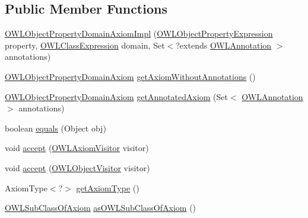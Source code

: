 \subsection*{Public Member Functions}
\begin{DoxyCompactItemize}
\item 
\hyperlink{classuk_1_1ac_1_1manchester_1_1cs_1_1owl_1_1owlapi_1_1_o_w_l_object_property_domain_axiom_impl_a8dd883bf8ac58d387d9b35abd653cf3d}{O\-W\-L\-Object\-Property\-Domain\-Axiom\-Impl} (\hyperlink{interfaceorg_1_1semanticweb_1_1owlapi_1_1model_1_1_o_w_l_object_property_expression}{O\-W\-L\-Object\-Property\-Expression} property, \hyperlink{interfaceorg_1_1semanticweb_1_1owlapi_1_1model_1_1_o_w_l_class_expression}{O\-W\-L\-Class\-Expression} domain, Set$<$?extends \hyperlink{interfaceorg_1_1semanticweb_1_1owlapi_1_1model_1_1_o_w_l_annotation}{O\-W\-L\-Annotation} $>$ annotations)
\item 
\hyperlink{interfaceorg_1_1semanticweb_1_1owlapi_1_1model_1_1_o_w_l_object_property_domain_axiom}{O\-W\-L\-Object\-Property\-Domain\-Axiom} \hyperlink{classuk_1_1ac_1_1manchester_1_1cs_1_1owl_1_1owlapi_1_1_o_w_l_object_property_domain_axiom_impl_a21d04b24f3100c7eaf90d4b30c1011f1}{get\-Axiom\-Without\-Annotations} ()
\item 
\hyperlink{interfaceorg_1_1semanticweb_1_1owlapi_1_1model_1_1_o_w_l_object_property_domain_axiom}{O\-W\-L\-Object\-Property\-Domain\-Axiom} \hyperlink{classuk_1_1ac_1_1manchester_1_1cs_1_1owl_1_1owlapi_1_1_o_w_l_object_property_domain_axiom_impl_a4aab14a032d919fa44319ec108f7fbd4}{get\-Annotated\-Axiom} (Set$<$ \hyperlink{interfaceorg_1_1semanticweb_1_1owlapi_1_1model_1_1_o_w_l_annotation}{O\-W\-L\-Annotation} $>$ annotations)
\item 
boolean \hyperlink{classuk_1_1ac_1_1manchester_1_1cs_1_1owl_1_1owlapi_1_1_o_w_l_object_property_domain_axiom_impl_a81376883daac9a211a1cd51ddcd9b6de}{equals} (Object obj)
\item 
void \hyperlink{classuk_1_1ac_1_1manchester_1_1cs_1_1owl_1_1owlapi_1_1_o_w_l_object_property_domain_axiom_impl_ac91ddde1062e93fceca02f403d5588c3}{accept} (\hyperlink{interfaceorg_1_1semanticweb_1_1owlapi_1_1model_1_1_o_w_l_axiom_visitor}{O\-W\-L\-Axiom\-Visitor} visitor)
\item 
void \hyperlink{classuk_1_1ac_1_1manchester_1_1cs_1_1owl_1_1owlapi_1_1_o_w_l_object_property_domain_axiom_impl_a04bd6b631d39008fb7d6f6d30eec592c}{accept} (\hyperlink{interfaceorg_1_1semanticweb_1_1owlapi_1_1model_1_1_o_w_l_object_visitor}{O\-W\-L\-Object\-Visitor} visitor)
\item 
Axiom\-Type$<$?$>$ \hyperlink{classuk_1_1ac_1_1manchester_1_1cs_1_1owl_1_1owlapi_1_1_o_w_l_object_property_domain_axiom_impl_a7e9d04d59241778481322d288355af20}{get\-Axiom\-Type} ()
\item 
\hyperlink{interfaceorg_1_1semanticweb_1_1owlapi_1_1model_1_1_o_w_l_sub_class_of_axiom}{O\-W\-L\-Sub\-Class\-Of\-Axiom} \hyperlink{classuk_1_1ac_1_1manchester_1_1cs_1_1owl_1_1owlapi_1_1_o_w_l_object_property_domain_axiom_impl_a225ec835380d70e7bf6e151dc42878ae}{as\-O\-W\-L\-Sub\-Class\-Of\-Axiom} ()
\end{DoxyCompactItemize}
